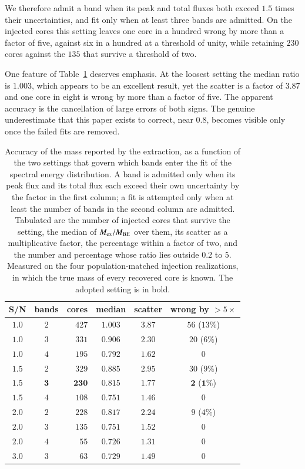 \documentclass{aa}
\newcommand{\Mex}{M_{\rm ex}}
\newcommand{\Mbe}{M_{\rm BE}}
\begin{document}
We therefore admit a band when its peak and total fluxes both exceed $1.5$
times their uncertainties, and fit only when at least three bands are admitted.
On the injected cores this setting leaves one core in a hundred wrong by more
than a factor of five, against six in a hundred at a threshold of unity, while
retaining $230$ cores against the $135$ that survive a threshold of two.

One feature of Table~\ref{tab:bands} deserves emphasis. At the loosest setting
the median ratio is $1.003$, which appears to be an excellent result, yet the
scatter is a factor of $3.87$ and one core in eight is wrong by more than a
factor of five. The apparent accuracy is the cancellation of large errors of
both signs. The genuine underestimate that this paper exists to correct, near
$0.8$, becomes visible only once the failed fits are removed.

\begin{table}
\caption{Accuracy of the mass reported by the extraction, as a function of the
two settings that govern which bands enter the fit of the spectral energy
distribution. A band is admitted only when its peak flux and its total flux
each exceed their own uncertainty by the factor in the first column; a fit is
attempted only when at least the number of bands in the second column are
admitted. Tabulated are the number of injected cores that survive the setting,
the median of $\Mex/\Mbe$ over them, its scatter as a multiplicative factor,
the percentage within a factor of two, and the number and percentage whose
ratio lies outside $0.2$ to $5$. Measured on the four population-matched
injection realizations, in which the true mass of every recovered core is
known. The adopted setting is in bold.}
\label{tab:bands}
\centering
\begin{tabular}{ccrccc}
\hline\hline
S/N & bands & cores & median & scatter & wrong by $>\!5\times$ \\
\hline
$1.0$ & $2$          & $427$ & $1.003$ & $3.87$ & $56$ ($13\%$) \\
$1.0$ & $3$          & $331$ & $0.906$ & $2.30$ & $20$ ($6\%$) \\
$1.0$ & $4$          & $195$ & $0.792$ & $1.62$ & $0$ \\
$1.5$ & $2$          & $329$ & $0.885$ & $2.95$ & $30$ ($9\%$) \\
$\mathbf{1.5}$ & $\mathbf{3}$ & $\mathbf{230}$ & $\mathbf{0.815}$
      & $\mathbf{1.77}$ & $\mathbf{2}$ ($\mathbf{1\%}$) \\
$1.5$ & $4$          & $108$ & $0.751$ & $1.46$ & $0$ \\
$2.0$ & $2$          & $228$ & $0.817$ & $2.24$ & $9$ ($4\%$) \\
$2.0$ & $3$          & $135$ & $0.751$ & $1.52$ & $0$ \\
$2.0$ & $4$          & $55$  & $0.726$ & $1.31$ & $0$ \\
$3.0$ & $3$          & $63$  & $0.729$ & $1.49$ & $0$ \\
\hline
\end{tabular}
\end{table}
\end{document}
